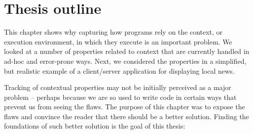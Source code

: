 \section{Thesis outline}

This chapter shows why capturing how programs rely on the context, or execution environment, in 
which they execute is an important problem. We looked at a number of properties related to context 
that are currently handled in ad-hoc and error-prone ways. Next, we considered the properties in a
simplified, but realistic example of a client/server application for displaying local news.

Tracking of contextual properties may not be initially perceived as a major problem -- perhaps
because we are so used to write code in certain ways that prevent us from seeing the flaws. The
purpose of this chapter was to expose the flaws and convince the reader that there should be a
better solution. Finding the foundations of such better solution is the goal of this thesis:

